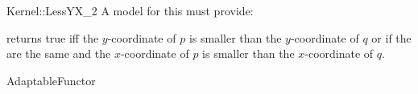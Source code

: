 \begin{ccRefFunctionObjectConcept}{Kernel::LessYX_2}
A model for this must provide:


{returns true iff the $y$-coordinate of $p$ is smaller than the
$y$-coordinate of $q$ or if the are the same and 
the $x$-coordinate of $p$ is smaller than the $x$-coordinate of $q$.}

\ccRefines
AdaptableFunctor

\ccSeeAlso
{}\\

\end{ccRefFunctionObjectConcept}
